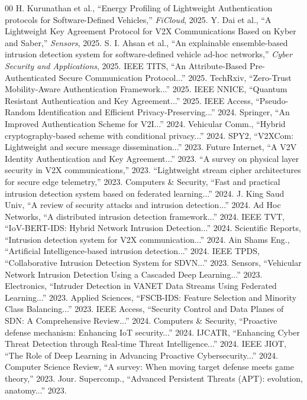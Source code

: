 \documentclass[journal]{IEEEtran}
\begin{document}
\begin{thebibliography}{00}
 H. Kurunathan et al., ``Energy Profiling of Lightweight Authentication protocols for Software-Defined Vehicles,'' \textit{FiCloud}, 2025.
 Y. Dai et al., ``A Lightweight Key Agreement Protocol for V2X Communications Based on Kyber and Saber,'' \textit{Sensors}, 2025.
 S. I. Ahsan et al., ``An explainable ensemble-based intrusion detection system for software-defined vehicle ad-hoc networks,'' \textit{Cyber Security and Applications}, 2025.
 IEEE TITS, ``An Attribute-Based Pre-Authenticated Secure Communication Protocol...'' 2025.
 TechRxiv, ``Zero-Trust Mobility-Aware Authentication Framework...'' 2025.
 IEEE NNICE, ``Quantum Resistant Authentication and Key Agreement...'' 2025.
 IEEE Access, ``Pseudo-Random Identification and Efficient Privacy-Preserving...'' 2024.
 Springer, ``An Improved Authentication Scheme for V2I...'' 2024.
 Vehicular Comm., ``Hybrid cryptography-based scheme with conditional privacy...'' 2024.
 SPY2, ``V2XCom: Lightweight and secure message dissemination...'' 2023.
 Future Internet, ``A V2V Identity Authentication and Key Agreement...'' 2023.
 ``A survey on physical layer security in V2X communications,'' 2023.
 ``Lightweight stream cipher architectures for secure edge telemetry,'' 2023.
 Computers \& Security, ``Fast and practical intrusion detection system based on federated learning...'' 2024.
 J. King Saud Univ, ``A review of security attacks and intrusion detection...'' 2024.
 Ad Hoc Networks, ``A distributed intrusion detection framework...'' 2024.
 IEEE TVT, ``IoV-BERT-IDS: Hybrid Network Intrusion Detection...'' 2024.
 Scientific Reports, ``Intrusion detection system for V2X communication...'' 2024.
 Ain Shams Eng., ``Artificial Intelligence-based intrusion detection...'' 2024.
 IEEE TPDS, ``Collaborative Intrusion Detection System for SDVN...'' 2023.
 Sensors, ``Vehicular Network Intrusion Detection Using a Cascaded Deep Learning...'' 2023.
 Electronics, ``Intruder Detection in VANET Data Streams Using Federated Learning...'' 2023.
 Applied Sciences, ``FSCB-IDS: Feature Selection and Minority Class Balancing...'' 2023.
 IEEE Access, ``Security Control and Data Planes of SDN: A Comprehensive Review...'' 2024.
 Computers \& Security, ``Proactive defense mechanism: Enhancing IoT security...'' 2024.
 IJCATR, ``Enhancing Cyber Threat Detection through Real-time Threat Intelligence...'' 2024.
 IEEE JIOT, ``The Role of Deep Learning in Advancing Proactive Cybersecurity...'' 2024.
 Computer Science Review, ``A survey: When moving target defense meets game theory,'' 2023.
 Jour. Supercomp., ``Advanced Persistent Threats (APT): evolution, anatomy...'' 2023.
\end{thebibliography}
\end{document}
